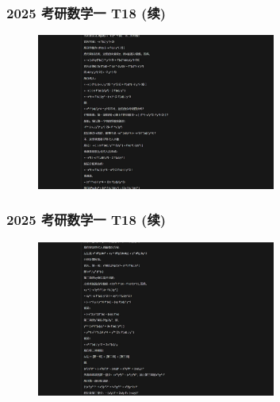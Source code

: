 \begin{frame}
\frametitle{2025 考研数学一 T18 (续)}
\begin{figure}
    \centering
    \includegraphics[width=0.7\textwidth]{./pic/9.png} %
    \label{fig:kaoyan_solution_1}
\end{figure}
\end{frame}

\begin{frame}
\frametitle{2025 考研数学一 T18 (续)}
\begin{figure}
    \centering
    \includegraphics[width=0.7\textwidth]{./pic/10.png} %
    \label{fig:kaoyan_solution_2}
\end{figure}
\end{frame}

